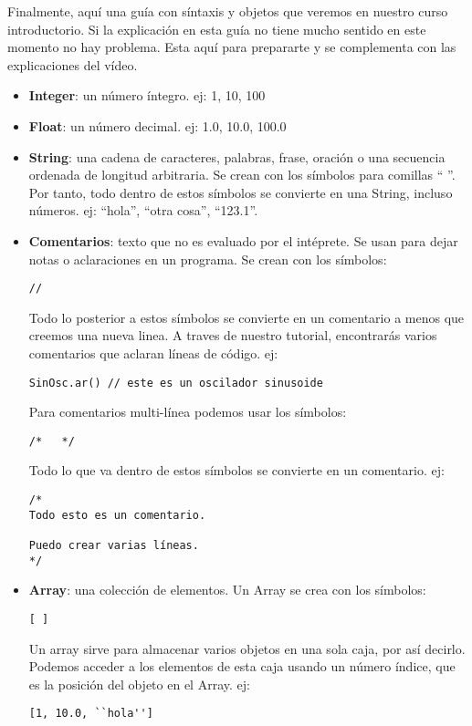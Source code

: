 Finalmente, aquí una guía con síntaxis y objetos que veremos en nuestro curso introductorio. Si la explicación en esta guía no tiene mucho sentido en este momento no hay problema. Esta aquí para prepararte y se complementa con las explicaciones del vídeo. 

\begin{itemize}

\item \textbf{Integer}: un número íntegro. ej: 1, 10, 100

\item \textbf{Float}: un número decimal. ej: 1.0, 10.0, 100.0

\item \textbf{String}: una cadena de caracteres, palabras, frase, oración o una secuencia ordenada de longitud arbitraria. Se crean con los símbolos para comillas `` ''. Por tanto, todo dentro de estos símbolos se convierte en una String, incluso números. ej: ``hola'', ``otra cosa'', ``123.1''.

\item \textbf{Comentarios}: texto que no es evaluado por el intéprete. Se usan para dejar notas o aclaraciones en un programa. Se crean con los símbolos: 
\begin{verbatim} 
// 
\end{verbatim}
Todo lo posterior a estos símbolos se convierte en un comentario a menos que creemos una nueva linea. A traves de nuestro tutorial, encontrarás varios comentarios que aclaran líneas de código. ej:

\begin{verbatim} 
SinOsc.ar() // este es un oscilador sinusoide
\end{verbatim}

Para comentarios multi-línea podemos usar los símbolos:

\begin{verbatim} 
/*   */ 
\end{verbatim}

Todo lo que va dentro de estos símbolos se convierte en un comentario. ej:

\begin{verbatim} 
/*
Todo esto es un comentario.

Puedo crear varias líneas.
*/
\end{verbatim}

\item \textbf{Array}: una colección de elementos. Un Array se crea con los símbolos: 
\begin{verbatim} 
[ ] 
\end{verbatim} 
Un array sirve para almacenar varios objetos en una sola caja, por así decirlo. Podemos acceder a los elementos de esta caja usando un número índice, que es la posición del objeto en el Array. ej: 
\begin{verbatim} 
[1, 10.0, ``hola''] 
\end{verbatim}


\end{itemize}
